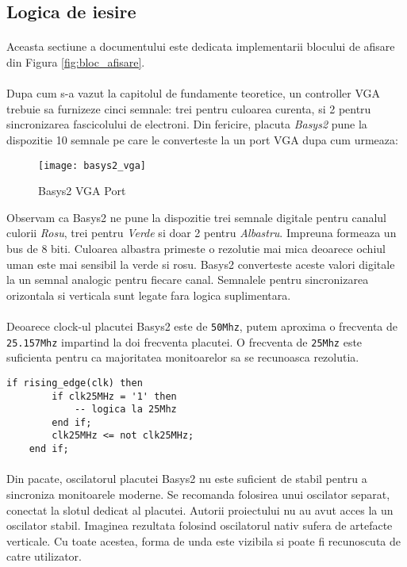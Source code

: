 \subsection{Logica de iesire}
\paragraph{}
Aceasta sectiune a documentului este dedicata implementarii blocului de afisare din Figura \ref{fig:bloc_afisare}.

\paragraph{}
Dupa cum s-a vazut la capitolul de fundamente teoretice, un controller VGA trebuie sa furnizeze cinci semnale: trei pentru culoarea curenta, si 2 pentru sincronizarea fascicolului de electroni. Din fericire, placuta \emph{Basys2} pune la dispozitie 10 semnale pe care le converteste la un port VGA dupa cum urmeaza:

\begin{figure}[h]
\centering
\texttt{[image: basys2\_vga]}
\caption{Basys2 VGA Port}
\label{fig:vga_pinout}
\end{figure}

Observam ca Basys2 ne pune la dispozitie trei semnale digitale pentru canalul culorii \emph{Rosu}, trei pentru \emph{Verde} si doar 2 pentru \emph{Albastru}. Impreuna formeaza un bus de 8 biti. Culoarea albastra primeste o rezolutie mai mica deoarece ochiul uman este mai sensibil la verde si rosu. Basys2 converteste aceste valori digitale la un semnal analogic pentru fiecare canal. Semnalele pentru sincronizarea orizontala si verticala sunt legate fara logica suplimentara.

\paragraph{}
Deoarece clock-ul placutei Basys2 este de {\tt50Mhz}, putem aproxima o frecventa de {\tt25.157Mhz} impartind la doi frecventa placutei. O frecventa de {\tt25Mhz} este suficienta pentru ca majoritatea monitoarelor sa se recunoasca rezolutia.

\begin{lstlisting}[frame=L]
    if rising_edge(clk) then
        if clk25MHz = '1' then
            -- logica la 25Mhz
        end if;
        clk25MHz <= not clk25MHz;
    end if;
\end{lstlisting}

\paragraph{}
Din pacate, oscilatorul placutei Basys2 nu este suficient de stabil pentru a sincroniza monitoarele moderne. Se recomanda folosirea unui oscilator separat, conectat la slotul dedicat al placutei. Autorii proiectului nu au avut acces la un oscilator stabil. Imaginea rezultata folosind oscilatorul nativ sufera de artefacte verticale. Cu toate acestea, forma de unda este vizibila si poate fi recunoscuta de catre utilizator.

